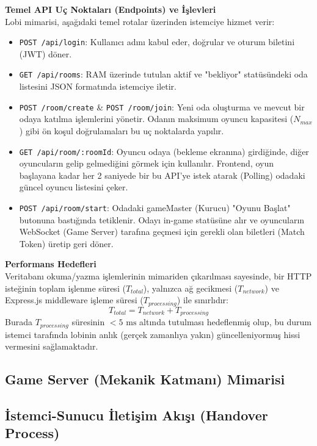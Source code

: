 \documentclass[12pt,a4paper]{article}
\begin{document}
\textbf{Temel API Uç Noktaları (Endpoints) ve İşlevleri} \\
Lobi mimarisi, aşağıdaki temel rotalar üzerinden istemciye hizmet verir:
\begin{itemize}
      \item \texttt{POST /api/login}: Kullanıcı adını kabul eder, doğrular ve oturum biletini (JWT) döner.
      \item \texttt{GET /api/rooms}: RAM üzerinde tutulan aktif ve "bekliyor" statüsündeki oda listesini
            JSON formatında istemciye iletir.
      \item \texttt{POST /room/create} \& \texttt{POST /room/join}: Yeni oda oluşturma ve mevcut bir
            odaya katılma işlemlerini yönetir. Odanın maksimum oyuncu kapasitesi ($N_{max}$) gibi ön koşul
            doğrulamaları bu uç noktalarda yapılır.
      \item \texttt{GET /api/room/:roomId}: Oyuncu odaya (bekleme ekranına) girdiğinde, diğer oyuncuların gelip
            gelmediğini görmek için kullanılır. Frontend, oyun başlayana kadar her 2 saniyede bir bu API'ye istek atarak
            (Polling) odadaki güncel oyuncu listesini çeker.
      \item \texttt{POST /api/room/start}: Odadaki gameMaster (Kurucu) "Oyunu Başlat" butonuna bastığında tetiklenir.
            Odayı in-game statüsüne alır ve oyuncuların WebSocket (Game Server) tarafına geçmesi için gerekli olan biletleri
            (Match Token) üretip geri döner.
\end{itemize}

\textbf{Performans Hedefleri} \\
Veritabanı okuma/yazma işlemlerinin mimariden çıkarılması sayesinde, bir HTTP isteğinin toplam işlenme süresi ($T_{total}$), yalnızca ağ gecikmesi ($T_{network}$) ve Express.js middleware işleme süresi ($T_{processing}$) ile sınırlıdır:
$$T_{total} = T_{network} + T_{processing}$$
Burada $T_{processing}$ süresinin $<5\text{ ms}$ altında tutulması hedeflenmiş olup, bu durum istemci tarafında lobinin anlık (gerçek zamanlıya yakın) güncelleniyormuş hissi vermesini sağlamaktadır.

\subsection{Game Server (Mekanik Katmanı) Mimarisi} %
\subsection{İstemci-Sunucu İletişim Akışı (Handover Process)} %
\end{document}
